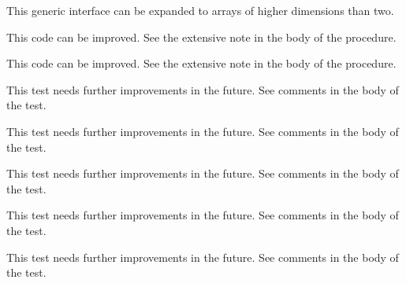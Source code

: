 \begin{DoxyRefList}
%
 This generic interface can be expanded to arrays of higher dimensions than two. 
\item[Subprogram \mbox{\hyperlink{namespaceSystem__mod_a8f999de90840ba33f9cf7f30edd41b3d}{System\+\_\+mod\+::copy\+File}} (path\+Old, path\+New, is\+Unix\+Shell, Err)]\label{todo__todo000082}%
%
 This code can be improved. See the extensive note in the body of the procedure.  
\item[Subprogram \mbox{\hyperlink{namespaceSystem__mod_acdbe0231b40135bc08ab285fc69f2b80}{System\+\_\+mod\+::get\+System\+Info}} (List, Err, OS, count, cache\+File)]\label{todo__todo000081}%
%
 This code can be improved. See the extensive note in the body of the procedure.  
\item[Subprogram \mbox{\hyperlink{namespaceTest__System__mod_a56a58918b2888e7ea0fa691de93cdeb3}{Test\+\_\+\+System\+\_\+mod\+::test\+\_\+\+Cmd\+Arg\+\_\+type\+\_\+1}} ()]\label{todo__todo000089}%
%
 This test needs further improvements in the future. See comments in the body of the test.  
\item[Subprogram \mbox{\hyperlink{namespaceTest__System__mod_a43fd8159ffe52170057e95d4e0c38d63}{Test\+\_\+\+System\+\_\+mod\+::test\+\_\+\+Env\+Var\+\_\+type\+\_\+1}} ()]\label{todo__todo000086}%
%
 This test needs further improvements in the future. See comments in the body of the test.  
\item[Subprogram \mbox{\hyperlink{namespaceTest__System__mod_ab0121f340538dae91c97cc5cdcba0a7b}{Test\+\_\+\+System\+\_\+mod\+::test\+\_\+\+Env\+Var\+\_\+type\+\_\+2}} ()]\label{todo__todo000087}%
%
 This test needs further improvements in the future. See comments in the body of the test.  
\item[Subprogram \mbox{\hyperlink{namespaceTest__System__mod_a26054fb4e3bf2d05710adc7965bc8431}{Test\+\_\+\+System\+\_\+mod\+::test\+\_\+\+Env\+Var\+\_\+type\+\_\+3}} ()]\label{todo__todo000088}%
%
 This test needs further improvements in the future. See comments in the body of the test.  
\item[Subprogram \mbox{\hyperlink{namespaceTest__System__mod_a8d37f80583c104a3dfb6b99a897feb26}{Test\+\_\+\+System\+\_\+mod\+::test\+\_\+execute\+Cmd\+\_\+1}} ()]\label{todo__todo000094}%
%
 This test needs further improvements in the future. See comments in the body of the test.  

\end{DoxyRefList}

